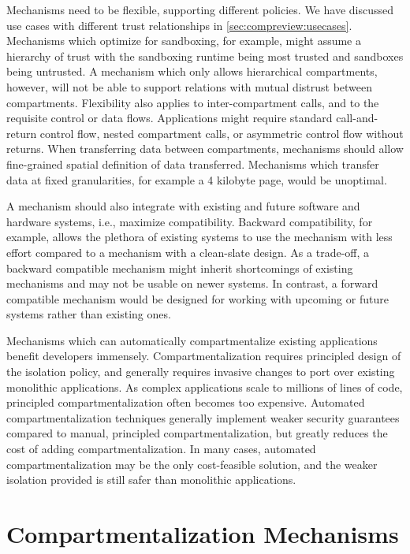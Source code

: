 Mechanisms need to be flexible, supporting different policies.
We have discussed use cases with different trust relationships in 
\autoref{sec:compreview:usecases}.
Mechanisms which optimize for sandboxing, for example, might assume
a hierarchy of trust with the sandboxing runtime being most trusted
and sandboxes being untrusted.
A mechanism which only allows hierarchical compartments, however,
will not be able to support relations with mutual distrust between
compartments.
Flexibility also applies to inter-compartment calls, and to the requisite
control or data flows.
Applications might require standard call-and-return control flow,
nested compartment calls, or asymmetric control flow without returns.
When transferring data between compartments, mechanisms should allow
fine-grained spatial definition of data transferred.
Mechanisms which transfer data at fixed granularities, for example a
4 kilobyte page, would be unoptimal.

A mechanism should also integrate with existing and future software and
hardware systems, i.e., maximize compatibility.
Backward compatibility, for example, allows the plethora of existing systems
to use the mechanism with less effort compared to a 
mechanism with a clean-slate design.
As a trade-off, a backward compatible mechanism might inherit shortcomings
of existing mechanisms and may not be usable on newer systems.
In contrast, a forward compatible mechanism would be designed for working
with upcoming or future systems rather than existing ones.

Mechanisms which can automatically compartmentalize existing applications
benefit developers immensely.
Compartmentalization requires principled design of the isolation policy,
and generally requires invasive changes to port over existing monolithic
applications.
As complex applications scale to millions of lines of code,
principled compartmentalization often becomes too expensive.
Automated compartmentalization techniques generally implement weaker
security guarantees compared to manual, principled compartmentalization,
but greatly reduces the cost of adding compartmentalization.
In many cases, automated compartmentalization may be the only 
cost-feasible solution, and the weaker isolation provided is still
safer than monolithic applications.

\section{Compartmentalization Mechanisms}
\label{sec:compreview:mechanisms}

